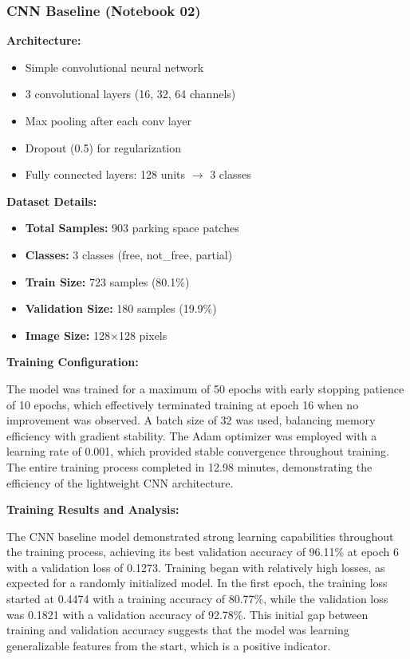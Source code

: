 \documentclass[12pt,a4paper]{article}
\begin{document}
\subsubsection{CNN Baseline (Notebook 02)}

\textbf{Architecture:}
\begin{itemize}
    \item Simple convolutional neural network
    \item 3 convolutional layers (16, 32, 64 channels)
    \item Max pooling after each conv layer
    \item Dropout (0.5) for regularization
    \item Fully connected layers: 128 units $\rightarrow$ 3 classes
\end{itemize}

\textbf{Dataset Details:}
\begin{itemize}
    \item \textbf{Total Samples:} 903 parking space patches
    \item \textbf{Classes:} 3 classes (free, not\_free, partial)
    \item \textbf{Train Size:} 723 samples (80.1\%)
    \item \textbf{Validation Size:} 180 samples (19.9\%)
    \item \textbf{Image Size:} 128×128 pixels
\end{itemize}

\textbf{Training Configuration:}

The model was trained for a maximum of 50 epochs with early stopping patience of 10 epochs, which effectively terminated training at epoch 16 when no improvement was observed. A batch size of 32 was used, balancing memory efficiency with gradient stability. The Adam optimizer was employed with a learning rate of 0.001, which provided stable convergence throughout training. The entire training process completed in 12.98 minutes, demonstrating the efficiency of the lightweight CNN architecture.

\textbf{Training Results and Analysis:}

The CNN baseline model demonstrated strong learning capabilities throughout the training process, achieving its best validation accuracy of 96.11\% at epoch 6 with a validation loss of 0.1273. Training began with relatively high losses, as expected for a randomly initialized model. In the first epoch, the training loss started at 0.4474 with a training accuracy of 80.77\%, while the validation loss was 0.1821 with a validation accuracy of 92.78\%. This initial gap between training and validation accuracy suggests that the model was learning generalizable features from the start, which is a positive indicator.
\end{document}
